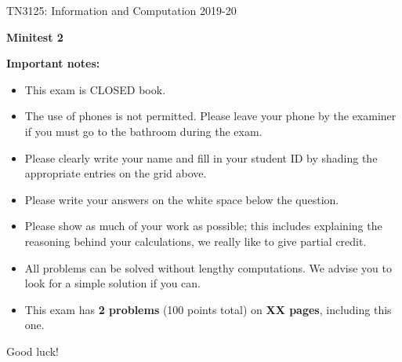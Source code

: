 \documentclass[11pt,a4paper,twoside]{article}
\begin{document}
\vspace*{-3cm}
TN3125: Information and Computation 2019-20 \\

\vspace{8cm}

\noindent \begin{center}
\textbf{{\Large Minitest 2}}\\
\par\end{center}

\vspace*{1cm}

\noindent \textbf{Important notes:}

\begin{itemize}
\item This exam is CLOSED book.
\item The use of phones is not permitted. Please leave your phone by the examiner if you must go to the bathroom during the exam.
\item Please clearly write your name and fill in your student ID by shading the appropriate entries on the grid above.
\item Please write your answers on the white space below the question. 
\item Please show as much of your work as possible; this includes explaining the reasoning behind your calculations, we really like to give partial credit.
\item All problems can be solved without lengthy computations. We advise you to look for a simple solution if you can.
\item This exam has {\bf 2 problems} (100 points total) on {\bf XX pages}, including this one.
\end{itemize}
\vspace{2cm}
Good luck!

\newpage

\newpage

\end{document}
